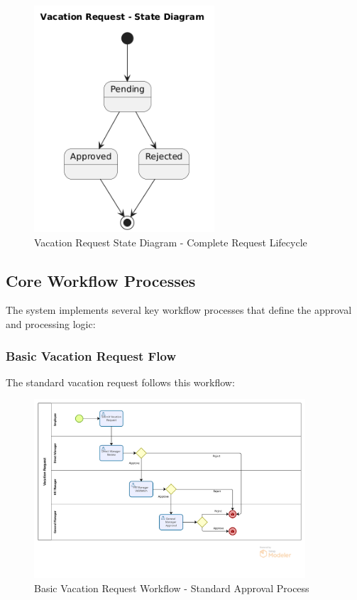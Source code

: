 \documentclass[12pt,a4paper]{article}
\begin{document}
\begin{figure}[H]
\centering
\includegraphics[width=0.6\textwidth]{Diagrams/State-Diagram/State-Diagram.png}
\caption{Vacation Request State Diagram - Complete Request Lifecycle}
\label{fig:state-diagram}
\end{figure}

\subsection{Core Workflow Processes}
The system implements several key workflow processes that define the approval and processing logic:

\subsubsection{Basic Vacation Request Flow}
The standard vacation request follows this workflow:

\begin{figure}[H]
\centering
\includegraphics[width=0.9\textwidth]{Diagrams/Workflows/Vacation-Request-Basic-Flow/Vacation-Request-Basic-Flow.png}
\caption{Basic Vacation Request Workflow - Standard Approval Process}
\label{fig:basic-flow}
\end{figure}
\end{document}
